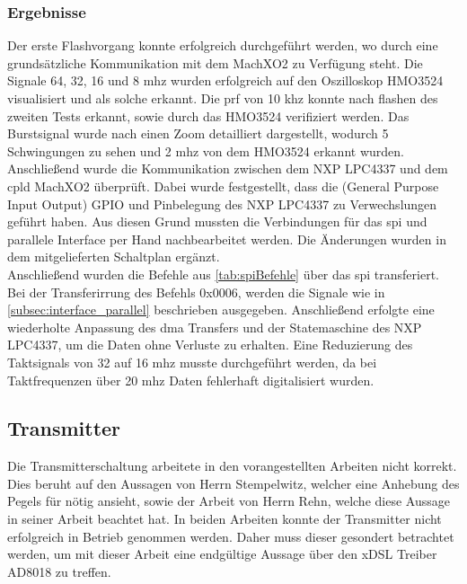 \subsubsection*{Ergebnisse}
Der erste Flashvorgang konnte erfolgreich durchgeführt werden, wo durch eine grundsätzliche Kommunikation mit dem MachXO2 zu Verfügung steht. Die Signale 64, 32, 16 und 8 \ac{mhz} wurden erfolgreich auf den Oszilloskop HMO3524 visualisiert und als solche erkannt. Die \ac{prf} von 10 \ac{khz} konnte nach flashen des zweiten Tests erkannt, sowie durch das HMO3524 verifiziert werden. Das Burstsignal wurde nach einen Zoom detailliert dargestellt, wodurch 5 Schwingungen zu sehen und 2 \ac{mhz} von dem HMO3524 erkannt wurden.\\
Anschließend wurde die Kommunikation zwischen dem NXP LPC4337 und dem \ac{cpld} MachXO2 überprüft. Dabei wurde festgestellt, dass die (General Purpose Input Output) GPIO und Pinbelegung des NXP LPC4337 zu Verwechslungen geführt haben. Aus diesen Grund mussten die Verbindungen für das \ac{spi} und parallele Interface per Hand nachbearbeitet werden. Die Änderungen wurden in dem mitgelieferten Schaltplan ergänzt.\\
Anschließend wurden die Befehle aus \autoref{tab:spiBefehle} über das \ac{spi} transferiert. Bei der Transferirrung des Befehls 0x0006, werden die Signale wie in \autoref{subsec:interface_parallel} beschrieben ausgegeben. Anschließend erfolgte eine wiederholte Anpassung des \ac{dma} Transfers und der Statemaschine des NXP LPC4337, um die Daten ohne Verluste zu erhalten. Eine Reduzierung des Taktsignals von 32 auf 16 \ac{mhz} musste durchgeführt werden, da bei Taktfrequenzen über 20 \ac{mhz} Daten fehlerhaft digitalisiert wurden.
\subsection{Transmitter}
Die Transmitterschaltung arbeitete in den vorangestellten Arbeiten nicht korrekt. Dies beruht auf den Aussagen von Herrn Stempelwitz, welcher eine Anhebung des Pegels für nötig ansieht\cite[Seite 40]{stemp2012}, sowie der Arbeit von Herrn Rehn, welche diese Aussage in seiner Arbeit beachtet hat. In beiden Arbeiten konnte der Transmitter nicht erfolgreich in Betrieb genommen werden\cite[Seite 55]{rehn2014}. Daher muss dieser gesondert betrachtet werden, um mit dieser Arbeit eine endgültige Aussage über den xDSL Treiber AD8018 zu treffen.
